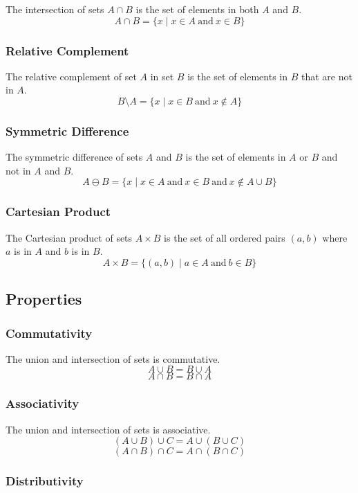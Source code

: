 \documentclass{article}
\begin{document}
The intersection of sets $A \cap B$ is the set of elements in both $A$ and $B$.
\[A \cap B = \{x \mid x \in A \ \mathrm{and} \ x \in B\} \]

\subsubsection{Relative Complement}

The relative complement of set $A$ in set $B$ is the set of elements in $B$ that are not in $A$.
\[B \setminus A = \{x \mid x \in B \ \mathrm{and} \ x \notin A\}\]

\subsubsection{Symmetric Difference}

The symmetric difference of sets $A$ and $B$ is the set of elements in $A$ or $B$ and not in $A$ and $B$.
\[A \ominus B = \{x \mid x \in A \ \mathrm{and} \ x \in B \ \mathrm{and} \ x \notin A \cup B\}\]

\subsubsection{Cartesian Product}

The Cartesian product of sets $A \times B$ is the set of all ordered pairs $(a,b)$ where $a$ is in $A$ and $b$ is in $B$.
\[A \times B = \{(a,b) \mid a \in A \ \mathrm{and} \ b \in B\}\]

\subsection{Properties}

\subsubsection{Commutativity}

The union and intersection of sets is commutative.
\[A \cup B = B \cup A\]
\[A \cap B = B \cap A\]

\subsubsection{Associativity}

The union and intersection of sets is associative.
\[(A \cup B) \cup C = A \cup (B \cup C)\]
\[(A \cap B) \cap C = A \cap (B \cap C)\]

\subsubsection{Distributivity}
\end{document}
